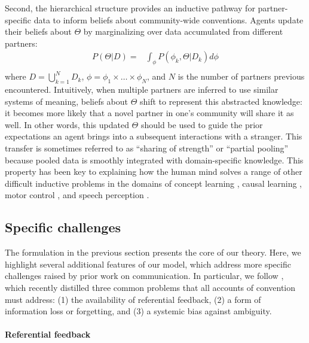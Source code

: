 Second, the hierarchical structure provides an inductive pathway for partner-specific data to inform beliefs about community-wide conventions.
Agents update their beliefs about $\Theta$ by marginalizing over data accumulated from different partners:
\begin{equation}
\begin{split}
    P(\Theta | D)  = & \int_{\phi} P(\phi_k, \Theta | D_k) d\phi \\
\end{split}
\end{equation}
where $D = \bigcup_{k=1}^N D_k$, $\phi = \phi_1 \times \dots \times \phi_N$, and $N$ is the number of partners previous encountered. 
Intuitively, when multiple partners are inferred to use similar systems of meaning, beliefs about $\Theta$ shift to represent this abstracted knowledge: it becomes more likely that a novel partner in one's community will share it as well.
In other words, this updated $\Theta$ should be used to guide the prior expectations an agent brings into a subsequent interactions with a stranger.
This transfer is sometimes referred to as ``sharing of strength'' or ``partial pooling'' because pooled data is smoothly integrated with domain-specific knowledge.
This property has been key to explaining how the human mind solves a range of other difficult inductive problems in the domains of concept learning \cite{KempPerforsTenenbaum07_HBM, tenenbaum_how_2011}, causal learning \cite{KempGoodmanTenenbaum10_LearningToLearn,GoodmanUllmanTenenbaum11_TheoryOfCausality},  motor control \cite{berniker2008estimating}, and speech perception \cite{kleinschmidt2015robust}.

\subsection{Specific challenges}

The formulation in the previous section presents the core of our theory.
Here, we highlight several additional features of our model, which address more specific challenges raised by prior work on communication. 
In particular, we follow , which recently distilled three common problems that all accounts of convention must address: (1) the availability of referential feedback, (2) a form of information loss or forgetting, and (3) a systemic bias against ambiguity.

\paragraph{Referential feedback}

